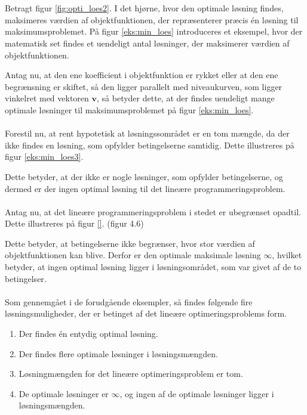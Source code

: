 \begin{eks}
\\\\
%
%
Betragt figur \ref{fig:opti_loes2}. 
I det hjørne, hvor den optimale løsning findes, maksimeres værdien af objektfunktionen, der repræsenterer præcis én løsning til maksimumsproblemet. 
På figur \ref{eks:min_loes} introduceres et eksempel, hvor der matematisk set findes et uendeligt antal løsninger, der
maksimerer værdien af objektfunktionen.
%

%
\noindent
Antag nu, at den ene koefficient i objektfunktion er rykket eller at den ene begrænsning er skiftet, så den ligger parallelt med niveaukurven, som ligger vinkelret med vektoren $\textbf{v}$, så betyder dette, at der findes uendeligt mange optimale løsninger til maksimumsproblemet på figur \ref{eks:min_loes}. 
\\\\
%
Forestil nu, at rent hypotetisk at løsningssområdet er en tom
mængde, da der ikke findes en løsning, som opfylder betingelserne samtidig. 
Dette illustreres på figur \ref{eks:min_loes3}.
%

%
\noindent
Dette betyder, at der ikke er nogle løsninger, som opfylder betingelserne, og dermed er der ingen optimal løsning til det lineære programmeringsproblem. 
\\\\
%
Antag nu, at det lineære programmeringsproblem i stedet er ubegrænset opadtil.
Dette illustreres på figur \ref{}. (figur 4.6)
%

%
\noindent
%
Dette betyder, at betingelserne ikke begrænser, hvor stor
værdien af objektfunktionen kan blive. 
Derfor er den optimale maksimale løsning $\infty$, hvilket betyder, at ingen optimal løsning ligger i løsningsområdet, som var givet af de to betingelser. 
\\\\
%
Som gennemgået i de forudgående eksempler, så findes følgende fire løsningsmuligheder, der er betinget af det lineære optimeringsproblems form.
%
\begin{enumerate}
\item Der findes én entydig optimal løsning.
\item Der findes flere optimale løsninger i løsningsmængden.
\item Løsningmængden for det lineære optimeringsproblem er tom. 
\item De optimale løsninger er $\infty$, og ingen af de optimale løsninger ligger i løsningsmængden.
\end{enumerate}
%
\end{eks}